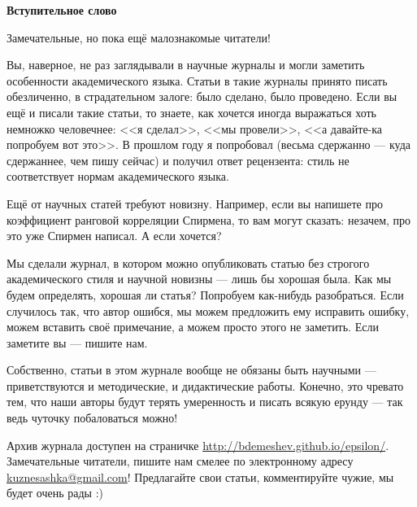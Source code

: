 \documentclass[11pt]{article}
\begin{document}
\pagestyle{empty}

\begin{center}
\Large\textbf{Вступительное слово}
\end{center}


Замечательные, но пока ещё малознакомые читатели!

Вы, наверное, не раз заглядывали в научные журналы и могли заметить
особенности академического языка. Статьи в такие журналы принято
писать обезличенно, в страдательном залоге: было сделано, было
проведено. Если вы ещё и писали такие статьи, то знаете, как хочется
иногда выражаться хоть немножко человечнее: <<я сделал>>, <<мы провели>>,
<<а давайте-ка попробуем вот это>>. В прошлом году я попробовал (весьма
сдержанно --- куда сдержаннее, чем пишу сейчас) и получил ответ
рецензента: стиль не соответствует нормам академического языка.

Ещё от научных статей требуют новизну. Например, если вы напишете про
коэффициент ранговой корреляции Спирмена, то вам могут сказать:
незачем, про это уже Спирмен написал. А если хочется?

Мы сделали журнал, в котором можно опубликовать статью без строгого
академического стиля и научной новизны --- лишь бы хорошая была. Как мы
будем определять, хорошая ли статья? Попробуем как-нибудь разобраться.
Если случилось так, что автор ошибся, мы можем предложить ему
исправить ошибку, можем вставить своё примечание, а можем просто этого
не заметить. Если заметите вы --- пишите нам.

Собственно, статьи в этом журнале вообще не обязаны быть научными ---
приветствуются и методические, и дидактические работы. Конечно, это
чревато тем, что наши авторы будут терять умеренность и писать всякую
ерунду --- так ведь чуточку побаловаться можно!

Архив журнала доступен на страничке \url{http://bdemeshev.github.io/epsilon/}. Замечательные читатели, пишите
нам смелее по электронному адресу \href{mailto:kuznesashka@gmail.com}{kuznesashka@gmail.com}! Предлагайте свои статьи, комментируйте чужие, мы будет очень рады :)
\end{document}
